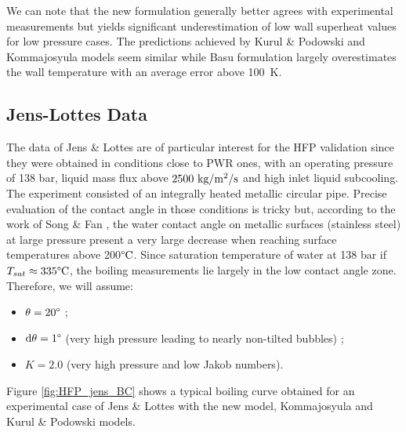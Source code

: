 \npar
We can note that the new formulation generally better agrees with experimental measurements but yields significant underestimation of low wall superheat values for low pressure cases. The predictions achieved by Kurul \& Podowski and Kommajosyula models seem similar while Basu \etal formulation largely overestimates the wall temperature with an average error above 100~K. 



\clearpage

\subsection{Jens-Lottes Data}
\label{subsec:HFP_verif_Jens}

The data of Jens \& Lottes are of particular interest for the HFP validation since they were obtained in conditions close to PWR ones, with an operating pressure of 138 bar, liquid mass flux above $2500\ \text{kg/m$^{2}$/s}$ and high inlet liquid subcooling. The experiment consisted of an integrally heated metallic circular pipe. Precise evaluation of the contact angle in those conditions is tricky but, according to the work of Song \& Fan \cite{song_temperature_2021}, the water contact angle on metallic surfaces (\eg stainless steel) at large pressure present a very large decrease when reaching surface temperatures above 200$\degree\mathrm{C}$. Since saturation temperature of water at 138 bar if $T_{sat} \approx 335 \degree\mathrm{C}$, the boiling measurements lie largely in the low contact angle zone. Therefore, we will assume:

\begin{itemize}
\item $\theta = 20 \degree$ ;
\item $\mathrm{d}\theta = 1 \degree$ (very high pressure leading to nearly non-tilted bubbles) ;
\item $K = 2.0$ (very high pressure and low Jakob numbers).
\end{itemize}


Figure \ref{fig:HFP_jens_BC} shows a typical boiling curve obtained for an experimental case of Jens \& Lottes with the new model, Kommajosyula and Kurul \& Podowski models.
\npar

